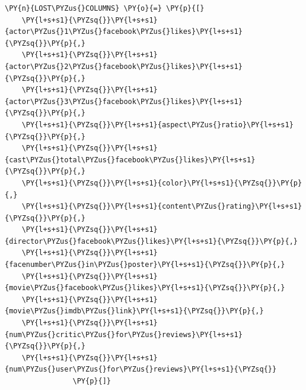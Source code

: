     \begin{tcolorbox}[breakable, size=fbox, boxrule=1pt, pad at break*=1mm,colback=cellbackground, colframe=cellborder]
\begin{Verbatim}[commandchars=\\\{\}]
\PY{n}{LOST\PYZus{}COLUMNS} \PY{o}{=} \PY{p}{[}
    \PY{l+s+s1}{\PYZsq{}}\PY{l+s+s1}{actor\PYZus{}1\PYZus{}facebook\PYZus{}likes}\PY{l+s+s1}{\PYZsq{}}\PY{p}{,}
    \PY{l+s+s1}{\PYZsq{}}\PY{l+s+s1}{actor\PYZus{}2\PYZus{}facebook\PYZus{}likes}\PY{l+s+s1}{\PYZsq{}}\PY{p}{,}
    \PY{l+s+s1}{\PYZsq{}}\PY{l+s+s1}{actor\PYZus{}3\PYZus{}facebook\PYZus{}likes}\PY{l+s+s1}{\PYZsq{}}\PY{p}{,}
    \PY{l+s+s1}{\PYZsq{}}\PY{l+s+s1}{aspect\PYZus{}ratio}\PY{l+s+s1}{\PYZsq{}}\PY{p}{,}
    \PY{l+s+s1}{\PYZsq{}}\PY{l+s+s1}{cast\PYZus{}total\PYZus{}facebook\PYZus{}likes}\PY{l+s+s1}{\PYZsq{}}\PY{p}{,}
    \PY{l+s+s1}{\PYZsq{}}\PY{l+s+s1}{color}\PY{l+s+s1}{\PYZsq{}}\PY{p}{,}
    \PY{l+s+s1}{\PYZsq{}}\PY{l+s+s1}{content\PYZus{}rating}\PY{l+s+s1}{\PYZsq{}}\PY{p}{,}
    \PY{l+s+s1}{\PYZsq{}}\PY{l+s+s1}{director\PYZus{}facebook\PYZus{}likes}\PY{l+s+s1}{\PYZsq{}}\PY{p}{,}
    \PY{l+s+s1}{\PYZsq{}}\PY{l+s+s1}{facenumber\PYZus{}in\PYZus{}poster}\PY{l+s+s1}{\PYZsq{}}\PY{p}{,}
    \PY{l+s+s1}{\PYZsq{}}\PY{l+s+s1}{movie\PYZus{}facebook\PYZus{}likes}\PY{l+s+s1}{\PYZsq{}}\PY{p}{,}
    \PY{l+s+s1}{\PYZsq{}}\PY{l+s+s1}{movie\PYZus{}imdb\PYZus{}link}\PY{l+s+s1}{\PYZsq{}}\PY{p}{,}
    \PY{l+s+s1}{\PYZsq{}}\PY{l+s+s1}{num\PYZus{}critic\PYZus{}for\PYZus{}reviews}\PY{l+s+s1}{\PYZsq{}}\PY{p}{,}
    \PY{l+s+s1}{\PYZsq{}}\PY{l+s+s1}{num\PYZus{}user\PYZus{}for\PYZus{}reviews}\PY{l+s+s1}{\PYZsq{}}
                \PY{p}{]}
\end{Verbatim}
\end{tcolorbox}

